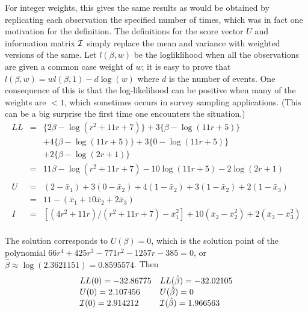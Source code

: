 \documentclass[11pt]{article}
\def\bhat{\hat \beta}        %
\def\xbar{\bar x}
\def\imat{{\cal I}}
\begin{document}
For integer weights, this gives the same results as would
be obtained by replicating each observation the specified number of times,
which was in fact one motivation for the definition.
The definitions for the score vector $U$ and information matrix $\imat$
simply replace the mean and variance with weighted versions of the same.
Let $l(\beta,w)$ be the logliklihood when all the observations are given
a common case weight of $w$; 
it is easy to prove that $l(\beta,w) = wl(\beta,1) - d\log(w)$ where $d$ is
the number of events.
One consequence of this is that the log-likelihood can be positive when many
of the weights are $<1$, which
sometimes occurs in survey sampling applications.  (This can be a big
surprise the first time one encounters the situation.)
\begin{eqnarray*}
LL &=& \{2\beta - \log(r^2 + 11r +7)\} + 3\{\beta - \log(11r+5)\} \\
   &&	+ 4\{\beta - \log(11r+5)\}  +3\{0 - \log(11r+5)\}  \\
   &&	+  2\{\beta - \log(2r+1) \} \\
   &=& 11\beta - \log(r^2 + 11r +7) -10\log(11r+5) - 2\log(2r+1) \\\\
U  &=& (2- \xbar_1) + 3(0-\xbar_2) + 4(1-\xbar_2) + 3(1-\xbar_2) + 
	2(1-\xbar_3) \\ 
   &=&  11 - (\xbar_1 + 10\xbar_2 + 2\xbar_3)  \\
I  &=& [(4r^2+11r)/(r^2+11r+7)- \xbar_1^2] + 10(\xbar_2 - \xbar_2^2) 
	+ 2(\xbar_3 - \xbar_3^2) \\
\end{eqnarray*}

 The solution corresponds to $U(\beta)=0$, which is the solution point of 
the polynomial $66r^4 + 425r^3 - 771r^2 - 1257r -385 =0$,
or $\bhat \approx \log(2.3621151) = 0.8595574$.
Then
$$
\begin{array}{ll}
 LL(0)=-32.86775 & LL(\bhat)=-32.02105 \\
 U(0) = 2.107456 & U(\bhat) = 0 \\
 \imat(0) = 2.914212 & \imat(\bhat) = 1.966563 
\end{array}
$$
\end{document}
